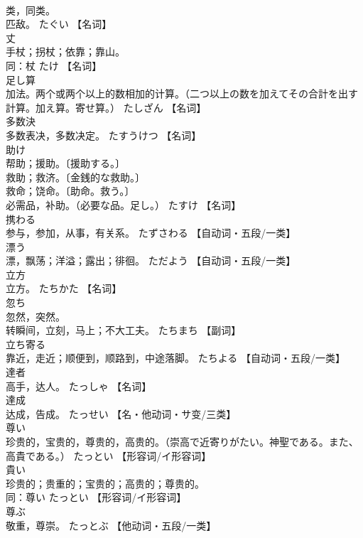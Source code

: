 \documentclass[8pt]{extreport}
\begin{document}
\begin{CJK}{UTF8}{min}
\\	类，同类。 
\\	匹敌。	たぐい		【名词】
\\	丈	
\\	手杖；拐杖；依靠；靠山。 
\\	同：杖	たけ		【名词】
\\	足し算	
\\	加法。两个或两个以上的数相加的计算。（二つ以上の数を加えてその合計を出す計算。加え算。寄せ算。）	たしざん		【名词】
\\	多数決	
\\	多数表决，多数决定。	たすうけつ		【名词】
\\	助け	
\\	帮助；援助。〔援助する。〕 
\\	救助；救济。〔金銭的な救助。〕 
\\	救命；饶命。〔助命。救う。〕 
\\	必需品，补助。（必要な品。足し。）	たすけ		【名词】
\\	携わる	
\\	参与，参加，从事，有关系。	たずさわる		【自动词・五段/一类】
\\	漂う	
\\	漂，飘荡；洋溢；露出；徘徊。	ただよう		【自动词・五段/一类】
\\	立方	
\\	立方。	たちかた		【名词】
\\	忽ち	
\\	忽然，突然。 
\\	转瞬间，立刻，马上；不大工夫。	たちまち		【副词】
\\	立ち寄る	
\\	靠近，走近；顺便到，顺路到，中途落脚。	たちよる		【自动词・五段/一类】
\\	達者	
\\	高手，达人。	たっしゃ		【名词】
\\	達成	
\\	达成，告成。	たっせい		【名・他动词・サ变/三类】
\\	尊い	
\\	珍贵的，宝贵的，尊贵的，高贵的。（崇高で近寄りがたい。神聖である。また、高貴である。）	たっとい		【形容词/イ形容词】
\\	貴い	
\\	珍贵的；贵重的；宝贵的；高贵的；尊贵的。 
\\	同：尊い	たっとい		【形容词/イ形容词】
\\	尊ぶ	
\\	敬重，尊崇。	たっとぶ		【他动词・五段/一类】

\end{CJK}
\end{document}
